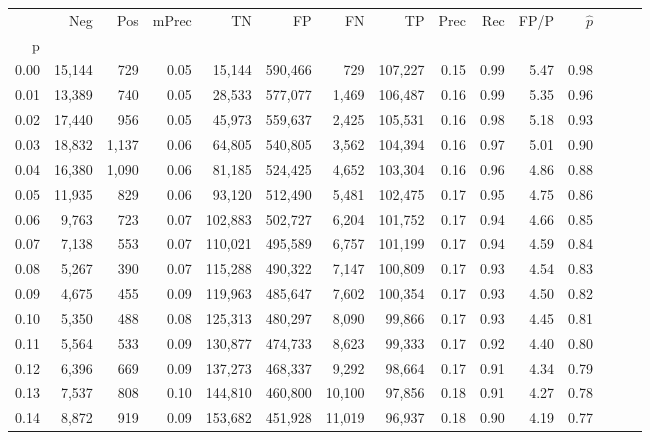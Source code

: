 \begin{tabular}{rrrrrrrrrrrrrrr}
\toprule
{} &     Neg &    Pos & mPrec &       TN &       FP &       FN &       TP &  Prec &   Rec &  FP/P & $\hat{p}$ \\
p    &         &        &       &          &          &          &          &       &       &       &           \\
\midrule
0.00 &  15,144 &    729 &  0.05 &   15,144 &  590,466 &      729 &  107,227 &  0.15 &  0.99 &  5.47 &      0.98 \\
0.01 &  13,389 &    740 &  0.05 &   28,533 &  577,077 &    1,469 &  106,487 &  0.16 &  0.99 &  5.35 &      0.96 \\
0.02 &  17,440 &    956 &  0.05 &   45,973 &  559,637 &    2,425 &  105,531 &  0.16 &  0.98 &  5.18 &      0.93 \\
0.03 &  18,832 &  1,137 &  0.06 &   64,805 &  540,805 &    3,562 &  104,394 &  0.16 &  0.97 &  5.01 &      0.90 \\
0.04 &  16,380 &  1,090 &  0.06 &   81,185 &  524,425 &    4,652 &  103,304 &  0.16 &  0.96 &  4.86 &      0.88 \\
0.05 &  11,935 &    829 &  0.06 &   93,120 &  512,490 &    5,481 &  102,475 &  0.17 &  0.95 &  4.75 &      0.86 \\
0.06 &   9,763 &    723 &  0.07 &  102,883 &  502,727 &    6,204 &  101,752 &  0.17 &  0.94 &  4.66 &      0.85 \\
0.07 &   7,138 &    553 &  0.07 &  110,021 &  495,589 &    6,757 &  101,199 &  0.17 &  0.94 &  4.59 &      0.84 \\
0.08 &   5,267 &    390 &  0.07 &  115,288 &  490,322 &    7,147 &  100,809 &  0.17 &  0.93 &  4.54 &      0.83 \\
0.09 &   4,675 &    455 &  0.09 &  119,963 &  485,647 &    7,602 &  100,354 &  0.17 &  0.93 &  4.50 &      0.82 \\
0.10 &   5,350 &    488 &  0.08 &  125,313 &  480,297 &    8,090 &   99,866 &  0.17 &  0.93 &  4.45 &      0.81 \\
0.11 &   5,564 &    533 &  0.09 &  130,877 &  474,733 &    8,623 &   99,333 &  0.17 &  0.92 &  4.40 &      0.80 \\
0.12 &   6,396 &    669 &  0.09 &  137,273 &  468,337 &    9,292 &   98,664 &  0.17 &  0.91 &  4.34 &      0.79 \\
0.13 &   7,537 &    808 &  0.10 &  144,810 &  460,800 &   10,100 &   97,856 &  0.18 &  0.91 &  4.27 &      0.78 \\
0.14 &   8,872 &    919 &  0.09 &  153,682 &  451,928 &   11,019 &   96,937 &  0.18 &  0.90 &  4.19 &      0.77 \\

\end{tabular}
